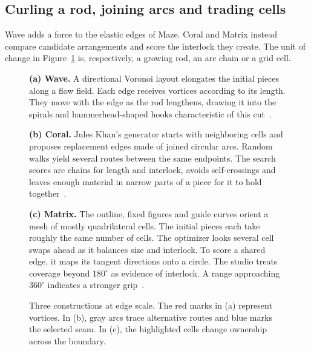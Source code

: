 \clearpage
\subsection{Curling a rod, joining arcs and trading cells}

Wave adds a force to the elastic edges of Maze. Coral and Matrix instead compare
candidate arrangements and score the interlock they create. The unit of change
in Figure~\ref{fig:constructed-seams} is, respectively, a growing rod, an arc
chain or a grid cell.

\begin{figure}[!ht]
\centering
\begin{minipage}{.98\linewidth}
\textbf{(a) Wave.}
A directional Voronoi layout elongates the initial pieces along a flow field.
Each edge receives vortices according to its length. They move with the edge as
the rod lengthens, drawing it into the spirals and hammerhead-shaped hooks
characteristic of this cut~\cite{wave,cutguide}.
\par\smallskip
{\centering{}\par}
\medskip
\textbf{(b) Coral.}
Jules Khan's generator starts with neighboring cells and proposes replacement
edges made of joined circular arcs. Random walks yield several routes between
the same endpoints. The search scores arc chains for length and interlock,
avoids self-crossings and leaves enough material in narrow parts of a piece
for it to hold together~\cite{coral,cutguide}.
\par\smallskip
{\centering{}\par}
\medskip
\textbf{(c) Matrix.}
The outline, fixed figures and guide curves orient a mesh of mostly quadrilateral
cells. The initial pieces each take roughly the same number of cells. The
optimizer looks several cell swaps ahead as it balances size and interlock. To
score a shared edge, it maps its tangent directions onto a circle. The studio
treats coverage beyond \(180^\circ\) as evidence of interlock. A range approaching
\(360^\circ\) indicates a stronger grip~\cite{matrix,cutguide}.
\par\smallskip
{\centering{}\par}
\end{minipage}
\caption{Three constructions at edge scale. The red marks in (a) represent
vortices. In (b), gray arcs trace alternative routes and blue marks the selected
seam. In (c), the highlighted cells change ownership across the boundary.}
\label{fig:constructed-seams}
\end{figure}
